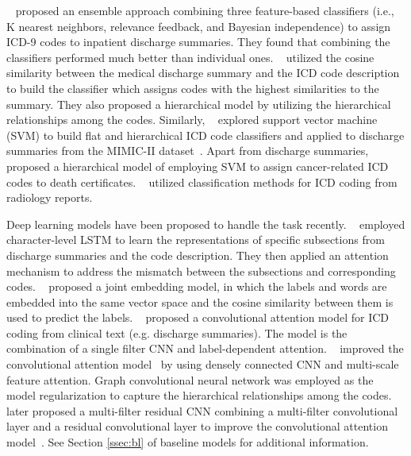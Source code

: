 \documentclass{article}
\begin{document}
\citeauthor{larkey1996combining}~ proposed an ensemble approach combining three feature-based classifiers (i.e., K nearest neighbors, relevance feedback, and Bayesian independence) to assign  ICD-9 codes to inpatient discharge summaries. They found that combining the classifiers performed much better than individual ones. \citeauthor{de1998hierarchical}~ utilized the cosine similarity between the medical discharge summary and the ICD code description to build the classifier which assigns codes with the highest similarities to the summary. They also proposed a hierarchical model by utilizing the hierarchical relationships among the codes. Similarly, \citeauthor{perotte2013diagnosis}~ explored support vector machine (SVM) to build flat and hierarchical ICD code classifiers and applied to discharge summaries from the MIMIC-II dataset~\cite{lee2011open}. Apart from discharge summaries, \citeauthor{koopman2015automatic}~ proposed a hierarchical model of employing SVM to assign cancer-related ICD codes to death certificates. \citeauthor{karimi2017automatic}~ utilized classification methods for ICD coding from radiology reports. 

Deep learning models have been proposed to handle the task recently. \citeauthor{shi2017towards}~ employed character-level LSTM to learn the representations of specific subsections from discharge summaries and the code description. They then applied an attention mechanism to address the mismatch between the subsections and corresponding codes. \citeauthor{wang2018joint}~ proposed a joint embedding model, in which the labels and words are embedded into the same vector space and the cosine similarity between them is used to predict the labels. \citeauthor{mullenbach2018}~ proposed a convolutional attention model for ICD coding from clinical text (e.g. discharge summaries). The model is the combination of a single filter CNN and label-dependent attention. \citeauthor{xie2019ehr}~ improved the convolutional attention model~\cite{mullenbach2018} by using densely connected CNN and multi-scale feature attention. Graph convolutional neural network \cite{KipfW16} was employed as the model regularization to capture the hierarchical relationships among the codes. \citeauthor{li2020multirescnn}~ later proposed a multi-filter residual CNN combining a multi-filter convolutional layer and a residual convolutional layer to improve the convolutional attention model~\cite{mullenbach2018}. See Section \ref{ssec:bl} of baseline models for additional information.
\end{document}
